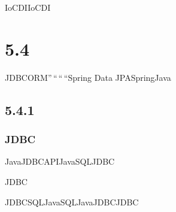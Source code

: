 IoCDIIoCDI

\hypertarget{section-58}{%
\section{5.4}\label{section-58}}

JDBCORM''\,``\,``\,``Spring Data JPASpringJava

\hypertarget{section-59}{%
\subsection{5.4.1}\label{section-59}}

\hypertarget{jdbc}{%
\subsubsection{JDBC}\label{jdbc}}

JavaJDBCAPIJavaSQLJDBC

\important{}JDBC

JDBCSQLJavaSQLJava\important{}JDBCJDBC

